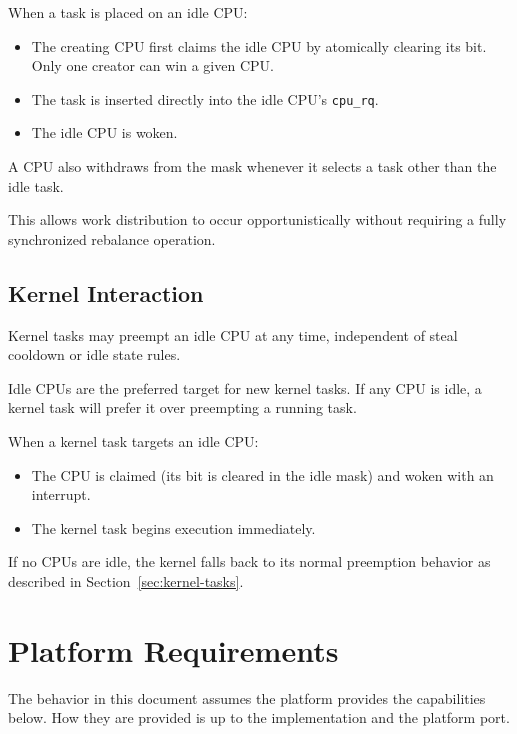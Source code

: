 \documentclass[11pt]{article}
\begin{document}
When a task is placed on an idle CPU:

\begin{itemize}
	\item The creating CPU first claims the idle CPU by atomically clearing its bit. Only one creator can win a given CPU.
	\item The task is inserted directly into the idle CPU's \texttt{cpu\_rq}.
	\item The idle CPU is woken.
\end{itemize}

A CPU also withdraws from the mask whenever it selects a task other than the idle task.

This allows work distribution to occur opportunistically without requiring a fully synchronized rebalance operation.

\subsection{Kernel Interaction}

Kernel tasks may preempt an idle CPU at any time, independent of steal cooldown or idle state rules.

Idle CPUs are the preferred target for new kernel tasks. If any CPU is idle, a kernel task will prefer it over preempting a running task.

When a kernel task targets an idle CPU:

\begin{itemize}
	\item The CPU is claimed (its bit is cleared in the idle mask) and woken with an interrupt.
	\item The kernel task begins execution immediately.
\end{itemize}

If no CPUs are idle, the kernel falls back to its normal preemption behavior as described in Section~\ref{sec:kernel-tasks}.

\section{Platform Requirements}
\label{sec:platform}

The behavior in this document assumes the platform provides the capabilities below.
How they are provided is up to the implementation and the platform port.
\end{document}
